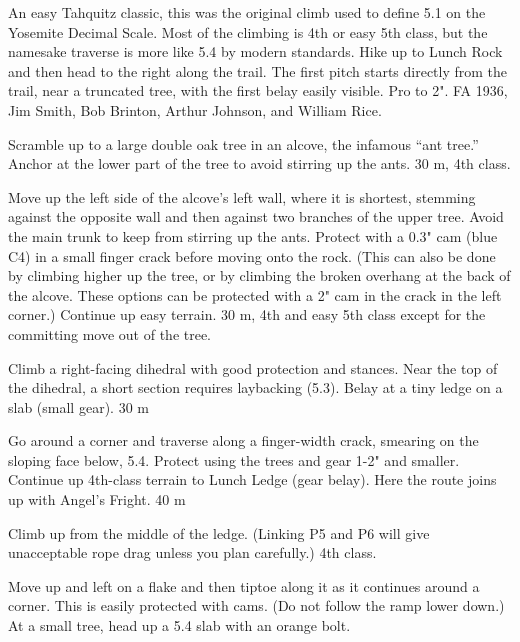 \documentclass{tahquitz}
\begin{document}
\tableofcontents

\vfill\pagebreak




An easy Tahquitz classic, this was the original climb used to define
5.1 on the Yosemite Decimal Scale. Most of the
climbing is 4th or easy 5th class, but the namesake traverse is more
like 5.4 by modern standards. Hike up to Lunch Rock and then head to the right along the
trail. The first pitch starts directly from the trail, near a 
truncated tree, with the first belay easily visible. Pro to 2". FA
1936, Jim Smith, Bob Brinton, Arthur Johnson, and William Rice.

 Scramble up to a large double oak tree in an alcove, the infamous
``ant tree.'' Anchor at the lower part of the tree to avoid stirring up
the ants. 30 m, 4th class.

 Move up the left side of the alcove's left wall, where it is
shortest, stemming against the opposite wall and then against two  branches
of the upper tree. Avoid the main trunk to keep from stirring up the ants.
Protect with a 0.3" cam (blue C4) in a small
finger crack before moving onto the rock. (This can also be done by
climbing higher up the tree, or by climbing the broken overhang at
the back of the alcove. These options can be protected with a 2" cam
in the crack in the left corner.) Continue up easy terrain. 30 m, 4th and easy 5th class
except for the committing move out of the tree.

 Climb a right-facing dihedral with good protection and
stances. Near the top of the dihedral, a short section requires laybacking (5.3).
Belay at a tiny ledge on a slab (small gear). 30 m

 Go around a corner and traverse along a finger-width crack,
smearing on the sloping face below, 5.4. Protect using the trees and
gear 1-2" and smaller. Continue up 4th-class terrain to Lunch Ledge (gear
belay). Here the route joins up with Angel's Fright. 40 m

 Climb up from the middle of the ledge. (Linking P5 and P6 will
give unacceptable rope drag unless you plan carefully.) 4th class.

 Move up and left on a flake
and then tiptoe along it as it continues around a corner.
This is easily protected with cams. (Do not follow the ramp lower down.) At a small
tree, head up a 5.4 slab with an orange bolt.
\end{document}
